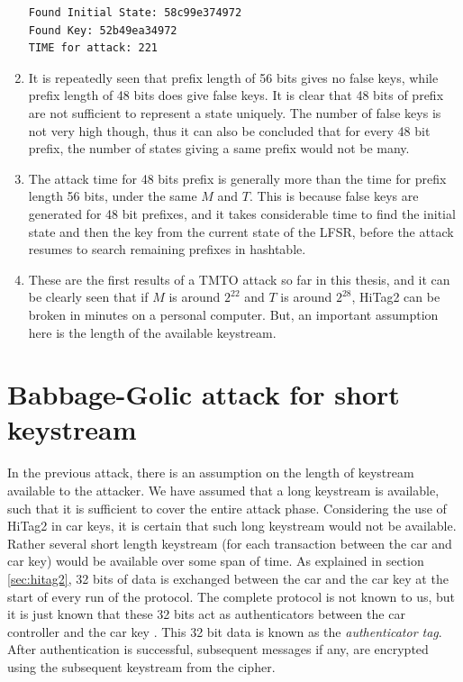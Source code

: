 \begin{enumerate}
\begin{lstlisting}[frame=tb]
Found Initial State: 58c99e374972
Found Key: 52b49ea34972
TIME for attack: 221
\end{lstlisting}

\item It is repeatedly seen that prefix length of 56 bits gives no false keys, while prefix length of 48 bits does give false keys. It is clear that 48 bits of prefix are not sufficient to represent a state uniquely. The number of false keys is not very high though, thus it can also be concluded that for every 48 bit prefix, the number of states giving a same prefix would not be many. 
 
\item The attack time for 48 bits prefix is generally more than the time for prefix length 56 bits, under the same $M$ and $T$. This is because false keys are generated for 48 bit prefixes, and it takes considerable time to find the initial state and then the key from the current state of the LFSR, before the attack resumes to search remaining prefixes in hashtable.

\item These are the first results of a TMTO attack so far in this thesis, and it can be clearly seen that if $M$ is around $2^{22}$ and $T$ is around $2^{28}$, HiTag2 can be broken in minutes on a personal computer. But, an important assumption here is the length of the available keystream.

\end{enumerate}

\newpage
\section{Babbage-Golic attack for short keystream}
\label{sec:bg-tags-attack}

In the previous attack, there is an assumption on the length of keystream available to the attacker. We have assumed that a long keystream is available, such that it is sufficient to cover the entire attack phase. Considering the use of HiTag2 in car keys, it is certain that such long keystream would not be available. Rather several short length keystream (for each transaction between the car and car key) would be available over some span of time. As explained in section \ref{sec:hitag2}, 32 bits of data is exchanged between the car and the car key at the start of every run of the protocol. The complete protocol is not known to us, but it is just known that these 32 bits act as authenticators between the car controller and the car key \cite{email-ruptor} \cite{hitag2-code}. This 32 bit data is known as the \emph{authenticator tag}. After authentication is successful, subsequent messages if any, are encrypted using the subsequent keystream from the cipher.

